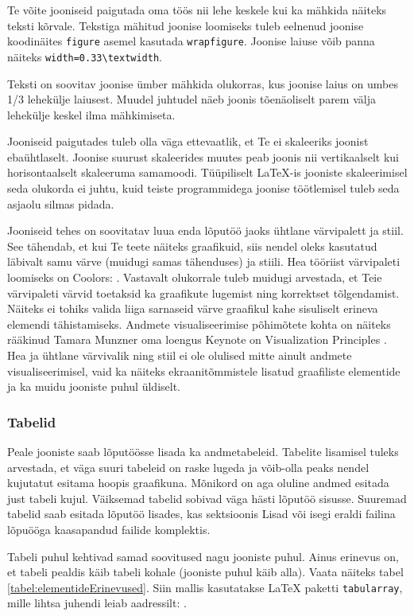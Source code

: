Te võite jooniseid paigutada oma töös nii lehe keskele kui ka mähkida näiteks teksti kõrvale. Tekstiga mähitud joonise loomiseks tuleb eelnenud joonise koodinäites \verb|figure| asemel kasutada \verb|wrapfigure|. Joonise laiuse võib panna näiteks \verb|width=0.33\textwidth|.

Teksti on soovitav joonise ümber mähkida olukorras, kus joonise laius on umbes 1/3 lehekülje laiusest. Muudel juhtudel näeb joonis tõenäoliselt parem välja lehekülje keskel ilma mähkimiseta.

Jooniseid paigutades tuleb olla väga ettevaatlik, et Te ei skaleeriks joonist ebaühtlaselt. Joonise suurust skaleerides muutes peab joonis nii vertikaalselt kui horisontaalselt skaleeruma samamoodi. Tüüpiliselt LaTeX-is jooniste skaleerimisel seda olukorda ei juhtu, kuid teiste programmidega joonise töötlemisel tuleb seda asjaolu silmas pidada.

Jooniseid tehes on soovitatav luua enda lõputöö jaoks ühtlane värvipalett ja stiil. See tähendab, et kui Te teete näiteks graafikuid, siis nendel oleks kasutatud läbivalt samu värve (muidugi samas tähenduses) ja stiili. Hea tööriist värvipaleti loomiseks on Coolors: . Vastavalt olukorrale tuleb muidugi arvestada, et Teie värvipaleti värvid toetaksid ka graafikute lugemist ning korrektset tõlgendamist. Näiteks ei tohiks valida liiga sarnaseid värve graafikul kahe sisuliselt erineva elemendi tähistamiseks. Andmete visualiseerimise põhimõtete kohta on näiteks rääkinud Tamara Munzner oma loengus Keynote on Visualization Principles \cite{tamara_munzner_keynote_2012}. Hea ja ühtlane värvivalik ning stiil ei ole olulised mitte ainult andmete visualiseerimisel, vaid ka näiteks ekraanitõmmistele lisatud graafiliste elementide ja ka muidu jooniste puhul üldiselt.

\subsubsection{Tabelid}
Peale jooniste saab lõputöösse lisada ka andmetabeleid. Tabelite lisamisel tuleks arvestada, et väga suuri tabeleid on raske lugeda ja võib-olla peaks nendel kujutatut esitama hoopis graafikuna. Mõnikord on aga oluline andmed esitada just tabeli kujul. Väiksemad tabelid sobivad väga hästi lõputöö sisusse. Suuremad tabelid saab esitada lõputöö lisades, kas sektsioonis Lisad või isegi eraldi failina lõpuööga kaasapandud failide komplektis.

Tabeli puhul kehtivad samad soovitused nagu jooniste puhul. Ainus erinevus on, et tabeli pealdis käib tabeli kohale (jooniste puhul käib alla). Vaata näiteks tabel \ref{tabel:elementideErinevused}. Siin mallis kasutatakse LaTeX paketti \verb|tabularray|, mille lihtsa juhendi leiab aadressilt: .

